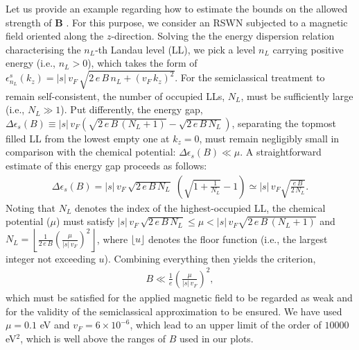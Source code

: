 \documentclass[aps,prb,onecolumn,nofootinbib,citeautoscript,10pt, showkeys]{revtex4-2}
\begin{document}
Let us provide an example regarding how to estimate the bounds on the allowed strength of $\boldsymbol{B}$ \cite{timm}.
For this purpose, we consider an RSWN subjected to a magnetic field oriented along the $z$-direction. Solving the the energy dispersion relation characterising the $n_L$-th Landau level (LL), we pick a level $ n_L $ carrying positive energy (i.e., $  n_L > 0$), which takes the form of
$ \epsilon^s_{n_L}(k_z) = |s|\, v_F \,\sqrt{2\,e\, B\, { n_L} + (v_F \,k_z)^2}$. For the semiclassical treatment to remain self-consistent, the number of occupied LLs, $N_L$, must be sufficiently large (i.e.,  $N_L \gg 1$). Put differently, the energy gap, $
\Delta \epsilon_s (B) \equiv |s|\, v_F \left( \sqrt{2 \,e\, B\,( {N}_L +1)} -\sqrt{2\,e\,B\, N_L} \right) $, separating the topmost filled LL from the lowest empty one at $k_z = 0$, must remain negligibly small in comparison with the chemical potential: $\Delta\epsilon_s (B) \ll \mu.$
A straightforward estimate of this energy gap proceeds as follows:
\begin{align}
 \Delta \epsilon_s (B) = |s|\,v_F \,\sqrt{2\,e \, B\, N_L }\;
 \left(\sqrt{1 + \frac{1}{N_L}} - 1\right) 
 \simeq |s|\, v_F\sqrt{\frac{e\,B}{2\, N_L}}.
\label{eqS4}
\end{align}
Noting that $N_L$ denotes the index of the highest-occupied LL, the chemical potential ($\mu$) must satisfy $ |s|\,v_F \, \sqrt{2 \, e \,B\,N_L} \leq \mu < |s|\, v_F \sqrt{2\,e\,B\,(N_L+1)}$ and
$  N_L = \left\lfloor \frac{1}{2\,e\,B}\left(\frac{\mu} {|s|\,v_F}\right)^2 \right\rfloor $,
where $\lfloor u \rfloor$ denotes the floor function (i.e., the largest integer not exceeding $u$). Combining everything then yields the criterion,
\begin{align}
    B \ll \frac{1}{e}\left(\frac{\mu} {|s|\, v_F}\right)^2,
    \label{S7}
\end{align}
which must be satisfied for the applied magnetic field to be regarded as weak and for the validity of the semiclassical approximation to be ensured. We have used $\mu = 0.1$ eV and $v_F = 6\times 10^{-6}$, which lead to an upper limit of the order of $10000$ eV$^2$, which is well above the ranges of $B$ used in our plots.
\end{document}
